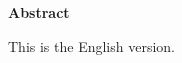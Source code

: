 \newpage

\vspace*{2.2 cm}
\Large
\noindent
{\bf Abstract} \\
\vspace*{0.1 cm}
\normalsize

\noindent
This is the English version.